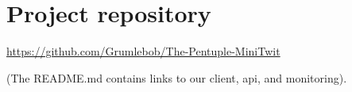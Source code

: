 \section{Project repository}
\label{appn:A}
\href{https://github.com/Grumlebob/The-Pentuple-MiniTwit}{https://github.com/Grumlebob/The-Pentuple-MiniTwit}

(The README.md contains links to our client, api, and monitoring).